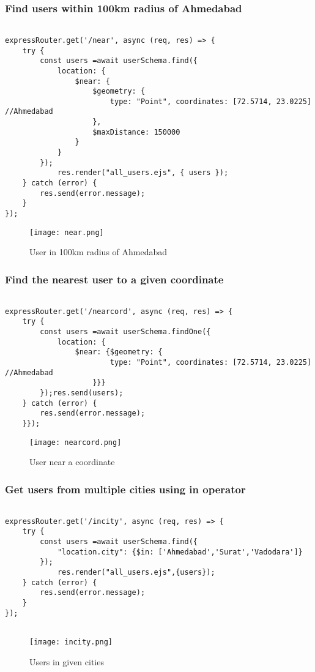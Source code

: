 \documentclass[12pt,a4paper]{article}
\begin{document}
\subsubsection{Find users within 100km radius of Ahmedabad}
\begin{lstlisting}
    
expressRouter.get('/near', async (req, res) => {
    try {
        const users =await userSchema.find({
            location: {
                $near: {
                    $geometry: {
                        type: "Point", coordinates: [72.5714, 23.0225] //Ahmedabad
                    },
                    $maxDistance: 150000
                }
            }
        });
            res.render("all_users.ejs", { users });
    } catch (error) {
        res.send(error.message);
    }
});

\end{lstlisting}
\begin{figure}[H]
    \centering
    \texttt{[image: near.png]}
    \caption{User in 100km radius of Ahmedabad}
    \label{fig:sample}
\end{figure}
\vspace{1em}
\subsubsection{Find the nearest user to a given coordinate}
\begin{lstlisting}
    
expressRouter.get('/nearcord', async (req, res) => {
    try {
        const users =await userSchema.findOne({
            location: {
                $near: {$geometry: {
                        type: "Point", coordinates: [72.5714, 23.0225] //Ahmedabad
                    }}}
        });res.send(users);
    } catch (error) {
        res.send(error.message);
    }});

\end{lstlisting}
\begin{figure}[H]
    \centering
    \texttt{[image: nearcord.png]}
    \caption{User near a coordinate}
    \label{fig:sample}
\end{figure}


\subsubsection{Get users from multiple cities using in operator}
\begin{lstlisting}
  
expressRouter.get('/incity', async (req, res) => {
    try {
        const users =await userSchema.find({
            "location.city": {$in: ['Ahmedabad','Surat','Vadodara']}
        });
            res.render("all_users.ejs",{users});
    } catch (error) {
        res.send(error.message);
    }
});


\end{lstlisting}
\begin{figure}[H]
    \centering
    \texttt{[image: incity.png]}
    \caption{Users in given cities}
    \label{fig:sample}
\end{figure}
\end{document}
